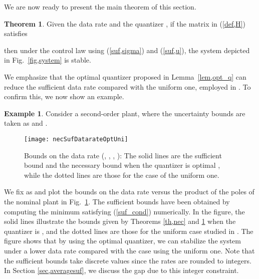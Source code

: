 \documentclass[a4paper, 11pt]{article}
\theoremstyle{definition}
\newtheorem{thm}{Theorem}
\newtheorem{exmp}{Example}
\newcommand{\fref}[1]{Fig.~\ref{#1}}
\begin{document}
We are now ready to present the main theorem of this section.
\begin{thm}\label{th,suf}
 Given the data rate  and the quantizer ,
if the matrix  in (\ref{def,H}) satisfies

then under the control law using (\ref{suf,sigma}) and (\ref{suf,u}),
the system depicted in \fref{fig,system} is stable.
\end{thm}


We emphasize that the optimal quantizer  proposed in Lemma~\ref{lem,opt_q}
can reduce the sufficient data rate compared with the uniform one,
employed in \cite{Martins2006, Phat2004, Okano2012}.
To confirm this, we now show an example.

\begin{exmp}\label{ex,necsuf}
Consider a second-order plant, where the uncertainty bounds are taken as
 and .
\begin{figure}[t]
 \centering
 \texttt{[image: necSufDatarateOptUni]}
 \caption{Bounds on the data rate (, , ,
 ):
 The solid lines are the sufficient bound and the necessary bound when
 the quantizer is optimal , while the dotted lines are those for
 the case of the uniform one.}
 \label{fig,necSufDatarateOptUni}
\end{figure}
We fix  as  and plot the bounds on the data rate
versus the product of the poles of the nominal plant 
in \fref{fig,necSufDatarateOptUni}.
The sufficient bounds have been obtained by computing the minimum  satisfying
(\ref{suf_cond}) numerically.
In the figure, the solid lines illustrate the bounds given by Theorems \ref{th,nec}
and \ref{th,suf} when the quantizer is , and the dotted lines are
those for the uniform case studied in \cite{Okano2012}.
The figure shows that by using the optimal quantizer, we can stabilize
the system under a lower data rate compared with the case using the uniform
one.
Note that the sufficient bounds take discrete values since the rates are
rounded to integers.
In Section \ref{sec,averagesuf}, we discuss the gap due to this integer constraint.
\end{exmp}
\end{document}
